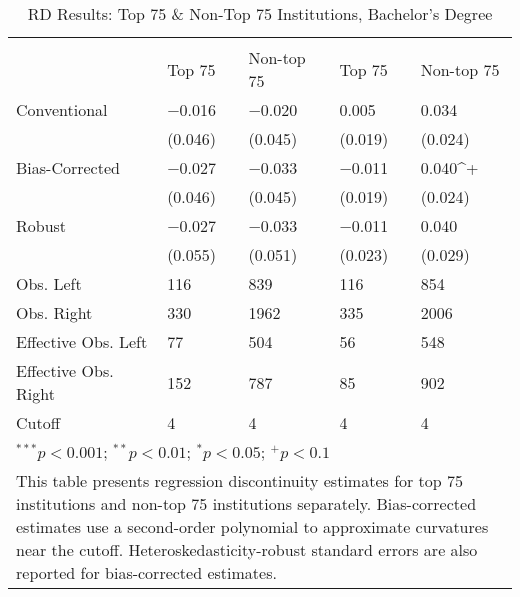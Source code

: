 \begin{table}
\caption{RD Results: Top 75 \& Non-Top 75 Institutions, Bachelor's Degree}
\centering
\begin{tabularx}{\textwidth}{l>{\centering\arraybackslash}X>{\centering\arraybackslash}X>{\centering\arraybackslash}X>{\centering\arraybackslash}X}
\toprule
  & \multicolumn{2}{c}{Minorities} & \multicolumn{2}{c}{Women} \\
\cmidrule(lr){2-3} \cmidrule(lr){4-5}
 & Top 75 & Non-top 75 & Top 75 & Non-top 75 \\
\midrule
Conventional & \num{-0.016} & \num{-0.020} & \num{0.005} & \num{0.034}\\
 & (\num{0.046}) & (\num{0.045}) & (\num{0.019}) & (\num{0.024})\\
Bias-Corrected & \num{-0.027} & \num{-0.033} & \num{-0.011} & \num{0.040}^+\\
 & (\num{0.046}) & (\num{0.045}) & (\num{0.019}) & (\num{0.024})\\
Robust & \num{-0.027} & \num{-0.033} & \num{-0.011} & \num{0.040}\\
 & (\num{0.055}) & (\num{0.051}) & (\num{0.023}) & (\num{0.029})\\
\midrule
Obs. Left & \num{116} & \num{839} & \num{116} & \num{854}\\
Obs. Right & \num{330} & \num{1962} & \num{335} & \num{2006}\\
Effective Obs. Left & \num{77} & \num{504} & \num{56} & \num{548}\\
Effective Obs. Right & \num{152} & \num{787} & \num{85} & \num{902}\\
Cutoff & \num{4} & \num{4} & \num{4} & \num{4}\\
\bottomrule
\multicolumn{5}{l}{\scriptsize \rule{0pt}{1em}$^{***}p<0.001$; $^{**}p<0.01$; $^{*}p<0.05$; $^{+}p<0.1$}\\
\multicolumn{5}{p{\textwidth}}{\scriptsize \rule{0pt}{1em}This table presents regression discontinuity estimates for top 75 institutions and non-top 75 institutions separately. Bias-corrected estimates use a second-order polynomial to approximate curvatures near the cutoff. Heteroskedasticity-robust standard errors are also reported for bias-corrected estimates.}\\
\end{tabularx}
\end{table}

